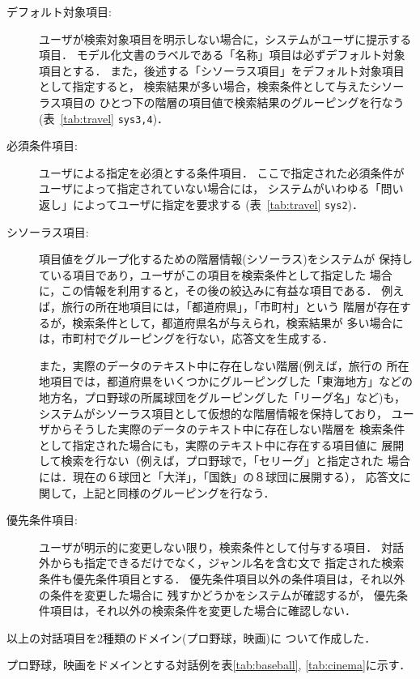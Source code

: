 \begin{description}
\item[デフォルト対象項目:] 
ユーザが検索対象項目を明示しない場合に，システムがユーザに提示する項目．
モデル化文書のラベルである「名称」項目は必ずデフォルト対象項目とする．
また，後述する「シソーラス項目」をデフォルト対象項目として指定すると，
検索結果が多い場合，検索条件として与えたシソーラス項目の
ひとつ下の階層の項目値で検索結果のグルーピングを行なう
(表~\ref{tab:travel} {\tt sys3,4})．

\item[必須条件項目:] 
ユーザによる指定を必須とする条件項目．
ここで指定された必須条件がユーザによって指定されていない場合には，
システムがいわゆる「問い返し」によってユーザに指定を要求する
(表~\ref{tab:travel} {\tt sys2})．

\item[シソーラス項目:] 
項目値をグループ化するための階層情報(シソーラス)をシステムが
保持している項目であり，ユーザがこの項目を検索条件として指定した
場合に，この情報を利用すると，その後の絞込みに有益な項目である．
例えば，旅行の所在地項目には，「都道府県」，「市町村」という
階層が存在するが，検索条件として，都道府県名が与えられ，検索結果が
多い場合には，市町村でグルーピングを行ない，応答文を生成する．

また，実際のデータのテキスト中に存在しない階層(例えば，旅行の
所在地項目では，都道府県をいくつかにグルーピングした「東海地方」などの
地方名，プロ野球の所属球団をグルーピングした「リーグ名」など)も，
システムがシソーラス項目として仮想的な階層情報を保持しており，
ユーザからそうした実際のデータのテキスト中に存在しない階層を
検索条件として指定された場合にも，実際のテキスト中に存在する項目値に
展開して検索を行ない（例えば，プロ野球で，「セリーグ」と指定された
場合には．現在の６球団と「大洋」，「国鉄」の８球団に展開する），
応答文に関して，上記と同様のグルーピングを行なう．

\item[優先条件項目:] 
ユーザが明示的に変更しない限り，検索条件として付与する項目．
対話外からも指定できるだけでなく，ジャンル名を含む文で
指定された検索条件も優先条件項目とする．
優先条件項目以外の条件項目は，それ以外の条件を変更した場合に
残すかどうかをシステムが確認するが，
優先条件項目は，それ以外の検索条件を変更した場合に確認しない．
\end{description}

以上の対話項目を2種類のドメイン(プロ野球\cite{baseball}，映画\cite{cinema})に
ついて作成した．

プロ野球，映画をドメインとする対話例を表\ref{tab:baseball},
\ref{tab:cinema}に示す．

